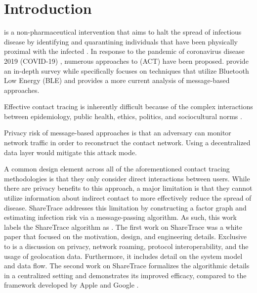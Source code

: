 \chapter{Introduction}

 is a non-pharmaceutical intervention that aims to halt the spread of infectious disease by identifying and quarantining individuals that have been physically proximal with the infected \citep{Brandt2022, PozoMartin2023}. In response to the pandemic of coronavirus disease 2019 (COVID-19) \citep{Zhu2020, Gorbalenya2020, Singh2021}, numerous approaches to  (ACT) have been proposed. \citet{Shubina2020} provide an in-depth survey while \citet{Reichert2021} specifically focuses on techniques that utilize Bluetooth Low Energy (BLE) and provides a more current analysis of message-based approaches.



Effective contact tracing is inherently difficult because of the complex interactions between epidemiology, public health, ethics, politics, and sociocultural norms \citep{Brandt2022}.


Privacy risk of message-based approaches is that an adversary can monitor network traffic in order to reconstruct the contact network. Using a decentralized data layer would mitigate this attack mode.

A common design element across all of the aforementioned contact tracing methodologies is that they only consider direct interactions between users. While there are privacy benefits to this approach, a major limitation is that they cannot utilize information about indirect contact to more effectively reduce the spread of disease. ShareTrace addresses this limitation by constructing a factor graph and estimating infection risk via a message-passing algorithm. As such, this work labels the ShareTrace algorithm as . The first work on ShareTrace was a white paper that focused on the motivation, design, and engineering details. Exclusive to \citet{Ayday2020} is a discussion on privacy, network roaming, protocol interoperability, and the usage of geolocation data. Furthermore, it includes detail on the system model and data flow. The second work on ShareTrace \citep{Ayday2021} formalizes the algorithmic details in a centralized setting and demonstrates its improved efficacy, compared to the framework developed by Apple and Google \cite{AppleGoogle}.

